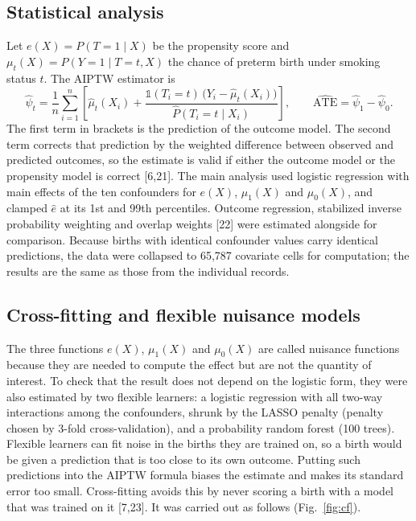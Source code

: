 \documentclass[11pt,letterpaper]{article}
\begin{document}
\subsection*{Statistical analysis}
Let $e(X)=P(T=1\mid X)$ be the propensity score and $\mu_t(X)=P(Y=1\mid T=t,X)$ the chance of preterm birth under smoking status $t$. The AIPTW estimator is
\begin{equation}
\hat\psi_t=\frac1n\sum_{i=1}^{n}\left[\hat\mu_t(X_i)+\frac{\mathbb{1}(T_i=t)\,\big(Y_i-\hat\mu_t(X_i)\big)}{\hat P(T_i=t\mid X_i)}\right],\qquad \widehat{\mathrm{ATE}}=\hat\psi_1-\hat\psi_0 .
\end{equation}
The first term in brackets is the prediction of the outcome model. The second term corrects that prediction by the weighted difference between observed and predicted outcomes, so the estimate is valid if either the outcome model or the propensity model is correct [6,21]. The main analysis used logistic regression with main effects of the ten confounders for $e(X)$, $\mu_1(X)$ and $\mu_0(X)$, and clamped $\hat e$ at its 1st and 99th percentiles. Outcome regression, stabilized inverse probability weighting and overlap weights [22] were estimated alongside for comparison. Because births with identical confounder values carry identical predictions, the data were collapsed to 65,787 covariate cells for computation; the results are the same as those from the individual records.

\subsection*{Cross-fitting and flexible nuisance models}
The three functions $e(X)$, $\mu_1(X)$ and $\mu_0(X)$ are called nuisance functions because they are needed to compute the effect but are not the quantity of interest. To check that the result does not depend on the logistic form, they were also estimated by two flexible learners: a logistic regression with all two-way interactions among the confounders, shrunk by the LASSO penalty (penalty chosen by 3-fold cross-validation), and a probability random forest (100 trees). Flexible learners can fit noise in the births they are trained on, so a birth would be given a prediction that is too close to its own outcome. Putting such predictions into the AIPTW formula biases the estimate and makes its standard error too small. Cross-fitting avoids this by never scoring a birth with a model that was trained on it [7,23]. It was carried out as follows (Fig.~\ref{fig:cf}).
\end{document}
